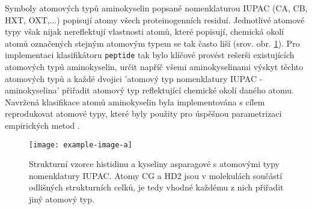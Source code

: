 Symboly atomových typů aminokyselin popsané nomenklaturou IUPAC (CA, CB, HXT, OXT,...) popisují atomy všech proteinogenních residuí. Jednotlivé atomové typy však nijak nereflektují vlastnosti atomů, které popisují, chemická okolí ato\-mů označených stejným atomovým typem se tak často liší (srov. obr. \ref{aa_different_atom_types}). Pro implementaci klasifikátoru \verb|peptide| tak bylo klíčové provést rešerši existujících atomových typů aminokyselin, určit napříč všemi aminokyselinami výskyt těchto atomových typů a každé dvojici 'atomový typ  nomenklatury IUPAC - aminokyselina' přiřadit atomový typ reflektující chemické okolí daného atomu. Navržená klasifikace atomů aminokyselin byla implementována s cílem reprodukovat atomové typy, které byly použity pro úspěšnou parametrizaci empirických metod \cite{GDAC, attyp_peptides}.

\begin{figure}[h]
\label{aa_different_atom_types}
\begin{center}
\texttt{[image: example-image-a]}
\caption{Strukturní vzorce histidinu a kyseliny asparagové s atomovými typy nomenklatury IUPAC. Atomy CG a HD2 jsou v molekulách součástí odlišných strukturních celků, je tedy vhodné každému z nich přiřadit jiný atomový typ.}
\end{center}
\end{figure}



 




